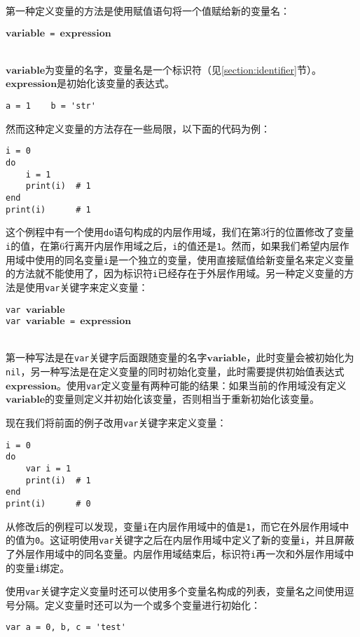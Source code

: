 第一种定义变量的方法是使用赋值语句将一个值赋给新的变量名：
\begin{algorithm}
$\bm{variable}$\texttt{ = }$\bm{expression}$
\end{algorithm}\vspace{-0.6em}\\
$\bm{variable}$为变量的名字，变量名是一个标识符（见\ref{section:identifier}节）。$\bm{expression}$是初始化该变量的表达式。
\begin{lstlisting}[language=berry, numbers=none]
a = 1    b = 'str'
\end{lstlisting}
然而这种定义变量的方法存在一些局限，以下面的代码为例：
\begin{lstlisting}[language=berry]
i = 0
do
    i = 1
    print(i)  # 1
end
print(i)      # 1
\end{lstlisting}
这个例程中有一个使用\texttt{do}语句构成的内层作用域，我们在第3行的位置修改了变量\texttt{i}的值，在第6行离开内层作用域之后，\texttt{i}的值还是\texttt{1}。然而，如果我们希望内层作用域中使用的同名变量\texttt{i}是一个独立的变量，使用直接赋值给新变量名来定义变量的方法就不能使用了，因为标识符\texttt{i}已经存在于外层作用域。另一种定义变量的方法是使用\texttt{var}关键字来定义变量：
\begin{algorithm}
\texttt{var }$\bm{variable}$ \\
\texttt{var }$\bm{variable}$\texttt{ = }$\bm{expression}$
\end{algorithm}\vspace{-0.6em}\\
第一种写法是在\texttt{var}关键字后面跟随变量的名字$\bm{variable}$，此时变量会被初始化为\texttt{nil}，另一种写法是在定义变量的同时初始化变量，此时需要提供初始值表达式$\bm{expression}$。使用\texttt{var}定义变量有两种可能的结果：如果当前的作用域没有定义$\bm{variable}$的变量则定义并初始化该变量，否则相当于重新初始化该变量。

现在我们将前面的例子改用\texttt{var}关键字来定义变量：
\begin{lstlisting}[language=berry]
i = 0
do
    var i = 1
    print(i)  # 1
end
print(i)      # 0
\end{lstlisting}
从修改后的例程可以发现，变量\texttt{i}在内层作用域中的值是\texttt{1}，而它在外层作用域中的值为\texttt{0}。这证明使用\texttt{var}关键字之后在内层作用域中定义了新的变量\texttt{i}，并且屏蔽了外层作用域中的同名变量。内层作用域结束后，标识符\texttt{i}再一次和外层作用域中的变量\texttt{i}绑定。

使用\texttt{var}关键字定义变量时还可以使用多个变量名构成的列表，变量名之间使用逗号分隔。定义变量时还可以为一个或多个变量进行初始化：
\begin{lstlisting}[language=berry, numbers=none]
var a = 0, b, c = 'test'
\end{lstlisting}

